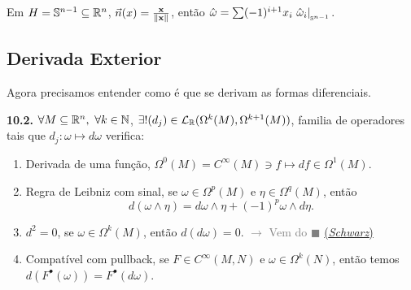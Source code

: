

\vspace{-0.8cm}

\begin{example}
    Em \(H = \mathbb{S}^{n-1}\subseteq \mathbb{R}^n\), \(\vec{n}(x) = \frac{\textbf{x}}{\|\textbf{x}\|}\), então \(\hat{\omega} = \sum (-1)^{i+1} x_i \ \hat{\omega}_i |_{_{\E^{n-1}}}\).
\end{example}


\subsection*{Derivada Exterior}

Agora precisamos entender como é que se derivam as formas diferenciais. 

\hypertarget{thm102}{}
\begin{theorem}
    \textbf{10.2.} \(\forall M\subseteq \mathbb{R}^n, \ \forall k \in \mathbb{N}\), \(\exists !(d_j) \in \mathcal{L}_{\mathbb{R}}(\Omega^k(M), \Omega^{k+1}(M))\), familia de operadores tais que \(d_j: \omega \mapsto d\omega\) verifica:  
    \begin{enumerate}[label= \roman*.]
        \item Derivada de uma função, \(\Omega^0(M) = C^\infty(M) \ni f \mapsto df \in \Omega^1(M)\). 
        \item Regra de Leibniz com sinal, se \(\omega \in \Omega^p(M)\) e \(\eta\in \Omega^q(M)\), então 
        \[ d(\omega \wedge \eta ) = d\omega \wedge \eta + (-1)^p \omega \wedge d \eta. \] \vspace{-1cm}
        \item \(d^2 =0\), se \(\omega \in \Omega^k(M)\), então \(d (d\omega) = 0\). \textcolor{gray}{\(\rightarrow \) Vem do \(\blacksquare\) \hyperlink{thmSchw}{(\emph{Schwarz})}}
        \item Compatível com pullback, se \(F \in C^\infty (M,N)\) e \(\omega \in \Omega^k(N)\), então temos \(d(F^{\bullet}(\omega)) = F^{\bullet}(d\omega)\). 
    \end{enumerate}
\end{theorem}

